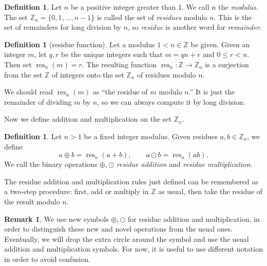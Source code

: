 \documentclass[11pt]{article}
\theoremstyle{definition}
\newtheorem{defn}[thm]{Definition}
\newtheorem{rmk}[thm]{Remark}
\newcommand{\Z}{\mathbb{Z}} %
\newcommand{\res}{\operatorname{res}}
\begin{document}
\begin{defn}
  Let $n$ be a positive integer greater than 1. We call $n$ the
  \emph{modulus}. The set \index{Z@$\Z_n$}$\Z_n = \{0,
  1, \dots, n-1 \}$ is called the set of \emph{residues} modulo $n$.
  This is the set of remainders for long division by $n$, so
  \emph{residue} is another word for \emph{remainder}.
\end{defn}


\begin{defn} [residue function]
  Let a modulus $1<n \in \Z$ be given. Given an integer $m$, let $q,r$
  be the unique integers such that $m = qn + r$ and $0 \le r < n$.
  Then set $\res_n(m) = r$. The resulting function
  $\res_n: \Z \to \Z_n$ is a surjection from the set $\Z$ of integers
  onto the set $\Z_n$ of residues modulo $n$.
\end{defn}

We should read $\res_n(m)$ as ``the residue of $m$ modulo $n$.'' It is
just the remainder of dividing $m$ by $n$, so we can always compute it
by long division.

Now we define addition and multiplication on the set $\Z_n$. 

\begin{defn}
  Let $n>1$ be a fixed integer modulus. Given residues $a,b \in \Z_n$,
  we define
  \[
  a \oplus b = \res_n(a+b), \qquad a \odot b = \res_n(ab).
  \]
  We call the binary operations $\oplus, \odot$ \emph{residue
    addition} and \emph{residue multiplication}.
\end{defn}

The residue addition and multiplication rules just defined can be
remembered as a two-step procedure: first, add or multiply in $\Z$ as
usual, then take the residue of the result modulo $n$.

\begin{rmk}
  We use new symbols $\oplus, \odot$ for residue addition and
  multiplication, in order to distinguish these new and novel
  operations from the usual ones. Eventually, we will drop the extra
  circle around the symbol and use the usual addition and
  multiplication symbols. For now, it is useful to use different
  notation in order to avoid confusion.
\end{rmk}
\end{document}
